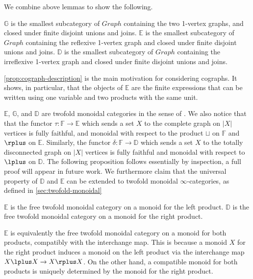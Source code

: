 We combine above lemmas to show the following.

\begin{proposition}\label{prop:cograph-description}
    $\mathbb{G}$ is the smallest subcategory of $Graph$ containing the two 1-vertex graphs, and closed under finite disjoint unions and joins. $\mathbb{E}$ is the smallest subcategory of $Graph$ containing the reflexive 1-vertex graph and closed under finite disjoint unions and joins. $\mathbb{D}$ is the smallest subcategory of $Graph$ containing the irreflexive 1-vertex graph and closed under finite disjoint unions and joins.
\end{proposition}

\cref{prop:cograph-description} is the main motivation for considering cographs. It shows, in particular, that the objects of $\mathbb{E}$ are the finite expressions that can be written using one variable and two products with the same unit.

$\mathbb{E}$, $\mathbb{G}$, and $\mathbb{D}$ are twofold monoidal categories in the sense of \cite{Balteanu-Fiedorowicz-Schwaenzl-Vogt}. We also notice that that the functor $\tau:\mathbb{F}\rightarrow \mathbb{E}$ which sends a set $X$ to the complete graph on $|X|$ vertices is fully faithful, and monoidal with respect to the product $\sqcup$ on $\mathbb{F}$ and $\rplus$ on $\mathbb{E}$. Similarly, the functor $\delta:\mathbb{F}\rightarrow \mathbb{D}$ which sends a set $X$ to the totally disconnected graph on $|X|$ vertices is fully faithful and monoidal with respect to $\lplus$ on $\mathbb{D}$. The following proposition follows essentially by inspection, a full proof will appear in future work. We furthermore claim that the universal property of $\mathbb{D}$ and $\mathbb{E}$ can be extended to twofold monoidal $\infty$-categories, as defined in \cref{sec:twofold-monoidal}

\begin{proposition} $\mathbb{E}$ is the free twofold monoidal category on a monoid for the left product. $\mathbb{D}$ is the free twofold monoidal category on a monoid for the right product.\label{lemma:E-universal-property}
\end{proposition}

\begin{remark} $\mathbb{E}$ is equivalently the free twofold monoidal category on a monoid for both products, compatibly with the interchange map. This is because a monoid $X$ for the right product induces a monoid on the left product via the interchange map $X\lplus X\rightarrow X\rplus X$. On the other hand, a compatible monoid for both products is uniquely determined by the monoid for the right product.
\end{remark}


